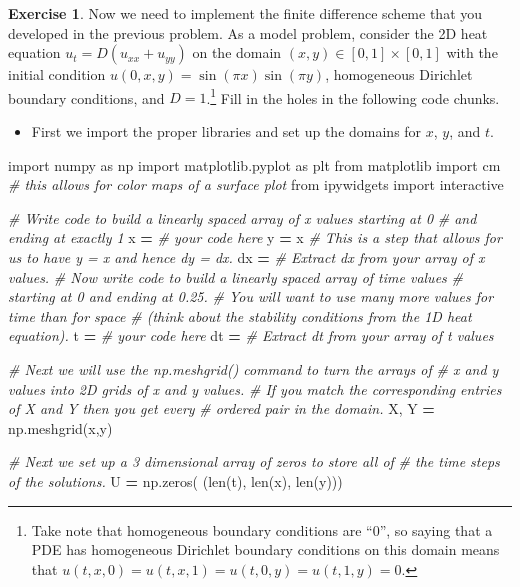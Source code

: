 \documentclass[
]{book}
\newenvironment{Shaded}{\begin{snugshade}}{\end{snugshade}}
\newcommand{\BuiltInTok}[1]{#1}
\newcommand{\CommentTok}[1]{\textcolor[rgb]{0.56,0.35,0.01}{\textit{#1}}}
\newcommand{\ImportTok}[1]{#1}
\newcommand{\NormalTok}[1]{#1}
\newcommand{\OperatorTok}[1]{\textcolor[rgb]{0.81,0.36,0.00}{\textbf{#1}}}
\providecommand{\tightlist}{%
  \setlength{\itemsep}{0pt}\setlength{\parskip}{0pt}}
\theoremstyle{definition}
\theoremstyle{definition}
\theoremstyle{definition}
\newtheorem{exercise}{Exercise}[chapter]
\theoremstyle{remark}
\begin{document}
\begin{exercise}
\protect\hypertarget{exr:unnamed-chunk-557}{}{\label{exr:unnamed-chunk-557} }Now we need to implement the finite difference scheme that you developed in the previous problem. As a model problem, consider the 2D heat equation \(u_t = D(u_{xx} + u_{yy})\) on the domain \((x,y) \in [0,1] \times [0,1]\) with the initial condition \(u(0,x,y) = \sin(\pi x)\sin(\pi y)\), homogeneous Dirichlet boundary conditions, and \(D=1\).\footnote{Take note that homogeneous boundary conditions are ``0'', so saying that a PDE has homogeneous Dirichlet boundary conditions on this domain means that \(u(t,x,0) = u(t,x,1)=u(t,0,y)=u(t,1,y)=0\).} Fill in the holes in the following code chunks.
\end{exercise}

\begin{itemize}
\tightlist
\item
  First we import the proper libraries and set up the domains for \(x\), \(y\), and \(t\).
\end{itemize}

\begin{Shaded}
\begin{Highlighting}[]
\ImportTok{import}\NormalTok{ numpy }\ImportTok{as}\NormalTok{ np}
\ImportTok{import}\NormalTok{ matplotlib.pyplot }\ImportTok{as}\NormalTok{ plt}
\ImportTok{from}\NormalTok{ matplotlib }\ImportTok{import}\NormalTok{ cm }\CommentTok{\# this allows for color maps of a surface plot}
\ImportTok{from}\NormalTok{ ipywidgets }\ImportTok{import}\NormalTok{ interactive}

\CommentTok{\# Write code to build a linearly spaced array of x values starting at 0 }
\CommentTok{\# and ending at exactly 1}
\NormalTok{x }\OperatorTok{=} \CommentTok{\# your code here}
\NormalTok{y }\OperatorTok{=}\NormalTok{ x }\CommentTok{\# This is a step that allows for us to have y = x and hence dy = dx.}
\NormalTok{dx }\OperatorTok{=} \CommentTok{\# Extract dx from your array of x values.}
\CommentTok{\# Now write code to build a linearly spaced array of time values }
\CommentTok{\# starting at 0 and ending at 0.25.}
\CommentTok{\# You will want to use many more values for time than for space }
\CommentTok{\# (think about the stability conditions from the 1D heat equation).}
\NormalTok{t }\OperatorTok{=} \CommentTok{\# your code here}
\NormalTok{dt }\OperatorTok{=} \CommentTok{\# Extract dt from your array of t values}

\CommentTok{\# Next we will use the np.meshgrid() command to turn the arrays of }
\CommentTok{\# x and y values into 2D grids of x and y values.  }
\CommentTok{\# If you match the corresponding entries of X and Y then you get every}
\CommentTok{\# ordered pair in the domain.}
\NormalTok{X, Y }\OperatorTok{=}\NormalTok{ np.meshgrid(x,y)}

\CommentTok{\# Next we set up a 3 dimensional array of zeros to store all of }
\CommentTok{\# the time steps of the solutions.}
\NormalTok{U }\OperatorTok{=}\NormalTok{ np.zeros( (}\BuiltInTok{len}\NormalTok{(t), }\BuiltInTok{len}\NormalTok{(x), }\BuiltInTok{len}\NormalTok{(y)))}
\end{Highlighting}
\end{Shaded}
\end{document}
